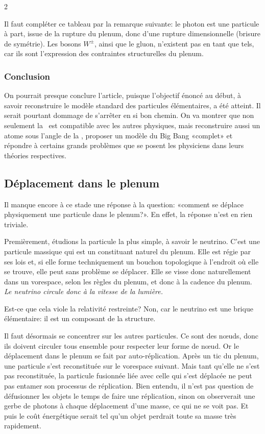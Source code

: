
\begin{multicols}{2}

Il faut compléter ce tableau par la remarque suivante: le photon est une
particule à part, issue de la rupture du plenum, donc d'une rupture
dimensionnelle (brisure de symétrie). Les bosons $W^\pm$, ainsi que le
gluon, n'existent pas en tant que tels, car ils sont l'expression des
contraintes structurelles du plenum.

\subsubsection{Conclusion}

On pourrait presque conclure l'article, puisque l'objectif énoncé
au début, à savoir reconstruire le modèle standard des particules
élémentaires, a été atteint. Il serait pourtant dommage de s'arrêter en si
bon chemin. On va montrer que non seulement la \PQ\ est compatible
avec les autres physiques, mais reconstruire aussi un atome sous
l'angle de la \PQ, proposer un modèle du Big Bang «complet» et
répondre à certains grands problèmes que se posent les physiciens dans
leurs théories respectives.

\subsection{Déplacement dans le plenum}

Il manque encore à ce stade une réponse à la question: «comment se
déplace physiquement une particule dans le plenum?». En effet, la
réponse n'est en rien triviale.

Premièrement, étudions la particule la plus simple, à savoir le
neutrino. C'est une particule massique qui est un constituant naturel
du plenum. Elle est régie par ses lois et, si elle forme techniquement
un bouchon topologique à l'endroit où elle se trouve, elle peut sans
problème se déplacer. Elle se visse donc naturellement dans un
vorespace, selon les règles du plenum, et donc à la cadence du plenum.
\textit{Le neutrino circule donc à la vitesse de la lumière.}

Est-ce que cela viole la relativité restreinte? Non, car le neutrino
est une brique élémentaire: il est un composant de la structure.

Il faut désormais se concentrer sur les autres particules. Ce sont des
nœuds, donc ils doivent circuler tous ensemble pour respecter leur forme
de nœud. Or le déplacement dans le plenum se fait par
auto-réplication. Après un tic du plenum, une particule s'est
reconstituée sur le vorespace suivant. Mais tant qu'elle ne s'est pas
reconstituée, la particule fusionnée liée avec celle qui s'est déplacée
ne peut pas entamer son processus de réplication. Bien entendu, il
n'est pas question de défusionner les objets le temps de faire une
réplication, sinon on observerait une gerbe de photons à chaque
déplacement d'une masse, ce qui ne se voit pas. Et puis le coût
énergétique serait tel qu'un objet perdrait toute sa masse très
rapidement.


\end{multicols}
